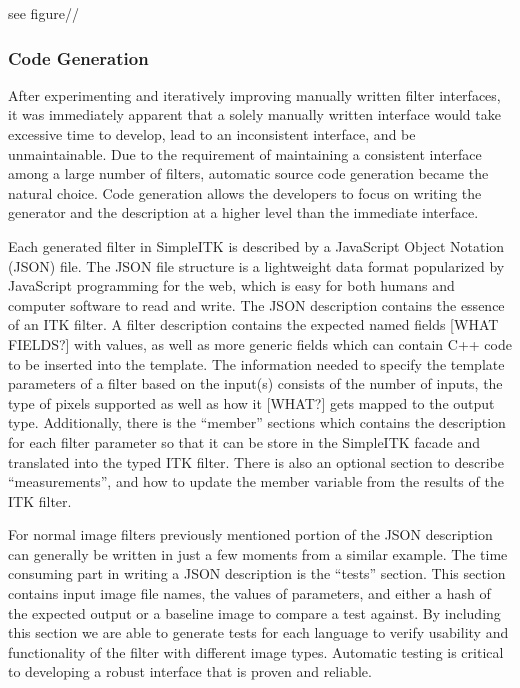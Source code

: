 \documentclass{frontiersMED} %
\begin{document}
        see figure//

\subsubsection{Code Generation}
After experimenting and iteratively improving manually written filter
interfaces, it was immediately apparent that a solely manually written
interface would take excessive time to develop, lead to an
inconsistent interface, and be unmaintainable. Due to the requirement
of maintaining a consistent interface among a large number of filters,
automatic source code generation became the natural choice. Code
generation allows the developers to focus on writing the generator and
the description at a higher level than the immediate interface.

Each generated filter in SimpleITK is described by a JavaScript Object
Notation (JSON) file. The JSON file structure is a lightweight data
format popularized by JavaScript programming for the web, which is
easy for both humans and computer software to read and write. The JSON
description contains the essence of an ITK filter. A filter
description contains the expected named fields [WHAT FIELDS?] with
values, as well as more generic fields which can contain C++ code to
be inserted into the template. The information needed to specify the
template parameters of a filter based on the input(s) consists of the
number of inputs, the type of pixels supported as well as how it
[WHAT?] gets mapped to the output type. Additionally, there is the
“member” sections which contains the description for each filter
parameter so that it can be store in the SimpleITK facade and
translated into the typed ITK filter. There is also an optional
section to describe “measurements”, and how to update the member
variable from the results of the ITK filter.

For normal image filters previously mentioned portion of the JSON
description can generally be written in just a few moments from a
similar example. The time consuming part in writing a JSON description
is the “tests” section. This section contains input image file names,
the values of parameters, and either a hash of the expected output or
a baseline image to compare a test against. By including this section
we are able to generate tests for each language to verify usability
and functionality of the filter with different image types. Automatic
testing is critical to developing a robust interface that is proven
and reliable.
\end{document}

